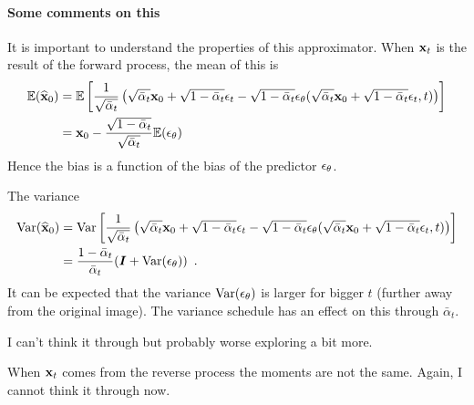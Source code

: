 \paragraph{Some comments on this}
It is important to understand the properties of this approximator.
When ${\mathbf{x}}_t$ is the result of the forward process, the mean of this is
\begin{align*}
    \mathbb{E}(\widehat{{\mathbf{x}}}_0) &= \mathbb{E} \left[ \frac{1}{\sqrt{\bar{\alpha}_t}} \left( \sqrt{\bar{\alpha}_t} {\mathbf{x}}_0 + \sqrt{1 - \bar{\alpha}_t} {\mathbf{\epsilon}}_t - \sqrt{1 - \bar{\alpha}_t} {\mathbf{\epsilon}}_{\theta} (\sqrt{\bar{\alpha}_t} {\mathbf{x}}_0 + \sqrt{1 - \bar{\alpha}_t} {\mathbf{\epsilon}}_t, t) \right) \right] \nonumber \\
    &= {\mathbf{x}}_0 - \frac{\sqrt{1 - \bar{\alpha}_t}}{\sqrt{\bar{\alpha}_t}} \mathbb{E}({\mathbf{\epsilon}}_{\theta} )
\end{align*}
Hence the bias is a function of the bias of the predictor ${\mathbf{\epsilon}}_{\theta}$.

The variance 
\begin{align*}
    \mathrm{Var}(\widehat{{\mathbf{x}}}_0) &= \mathrm{Var} \left[ \frac{1}{\sqrt{\bar{\alpha}_t}} \left( \sqrt{\bar{\alpha}_t} {\mathbf{x}}_0 + \sqrt{1 - \bar{\alpha}_t} {\mathbf{\epsilon}}_t - \sqrt{1 - \bar{\alpha}_t} {\mathbf{\epsilon}}_{\theta} (\sqrt{\bar{\alpha}_t} {\mathbf{x}}_0 + \sqrt{1 - \bar{\alpha}_t} {\mathbf{\epsilon}}_t, t) \right) \right] \nonumber \\
    &= \frac{1 - \bar{\alpha}_t}{\bar{\alpha}_t} ({\bm{I}} + \mathrm{Var}({\mathbf{\epsilon}}_{\theta})) \enspace .
\end{align*}
It can be expected that the variance $\mathrm{Var}({\mathbf{\epsilon}}_{\theta})$ is larger for bigger $t$ (further away from the original image).
The variance schedule has an effect on this through $\bar{\alpha}_t$.
\begin{notebox}[colback=red!5]
    I can't think it through but probably worse exploring a bit more.
\end{notebox}

\begin{notebox}[colback=red!5]
    When ${\mathbf{x}}_t$ comes from the reverse process the moments are not the same. Again, I cannot think it through now.
\end{notebox}
